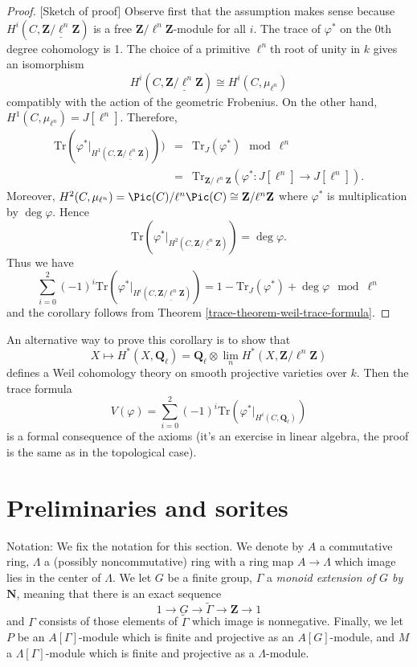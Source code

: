 \begin{proof}
[Sketch of proof]
Observe first that the assumption makes sense because $H^i(C,
\underline{\mathbf{Z}/\ell^n \mathbf{Z}})$ is a free $\mathbf{Z}/\ell^n
\mathbf{Z}$-module for all $i$. The trace of $\varphi^*$ on the 0th degree
cohomology is 1. The choice of a primitive $\ell^n$th root of unity in $k$
gives an isomorphism
$$
H^i(C, \underline{\mathbf{Z}/\ell^n \mathbf{Z}}) \cong H^i(C, \mu_{\ell^n})
$$
compatibly with the action of the geometric Frobenius. On the other hand,
$H^1(C, \mu_{\ell^n}) = J[\ell^n]$. Therefore,
\begin{eqnarray*}
\text{Tr}(\varphi^* |_{H^1 (C, \underline{\mathbf{Z}/\ell^n \mathbf{Z}})})) & =
& \text{Tr}_J (\varphi^*) \mod \ell^n \\
& = & \text{Tr}_{\mathbf{Z}/\ell^n \mathbf{Z}} (\varphi^* : J[\ell^n] \to
J[\ell^n]).
\end{eqnarray*}
Moreover, $H^2(C, \mu_{\ell^n}) = \Pic(C)/\ell^n\Pic(C) \cong
\mathbf{Z}/\ell^n \mathbf{Z}$ where $\varphi^*$ is multiplication by $\deg
\varphi$. Hence
$$
\text{Tr} (\varphi^*|_{H^2 (C, \underline{\mathbf{Z}/\ell^n \mathbf{Z}})}) =
\deg \varphi.
$$
Thus we have
$$
\sum_{i = 0}^2 (-1)^i
\text{Tr}(\varphi^* |_{H^i (C, \underline{\mathbf{Z}/\ell^n \mathbf{Z}})}) =
1 - \text{Tr}_J(\varphi^*) + \deg \varphi \mod \ell^n
$$
and the corollary follows from Theorem \ref{trace-theorem-weil-trace-formula}.
\end{proof}

An alternative way to prove this corollary is to show that
$$
X \mapsto H^* (X, \mathbf{Q}_\ell) =
\mathbf{Q}_\ell \otimes
\lim_n H^*(X, \mathbf{Z}/\ell^n\mathbf{Z})
$$
defines a Weil cohomology theory on smooth projective varieties over $k$. Then
the trace formula
$$
V(\varphi) = \sum_{i = 0}^2 (-1)^i
\text{Tr}(\varphi^* |_{H^i(C, \mathbf{Q}_\ell)})
$$
is a formal consequence of the axioms (it's an exercise in linear algebra, the
proof is the same as in the topological case).



\section{Preliminaries and sorites}
\label{trace-section-preliminaries}
Notation:
We fix the notation for this section. We denote by $A$ a commutative ring,
$\Lambda$ a (possibly noncommutative) ring with a ring map $A\to \Lambda$ which
image lies in the center of $\Lambda$. We let $G$ be a finite group, $\Gamma$ a
{\it monoid extension of $G$ by $\mathbf{N}$}, meaning that there is an exact
sequence
$$
1\to G\to \tilde\Gamma\to \mathbf{Z}\to 1
$$
and $\Gamma$ consists of those elements of $\tilde\Gamma$ which image is
nonnegative. Finally, we let $P$ be an $A[\Gamma]$-module which is finite and
projective as an $A[G]$-module, and $M$ a $\Lambda[\Gamma]$-module which is
finite and projective as a $\Lambda$-module.

